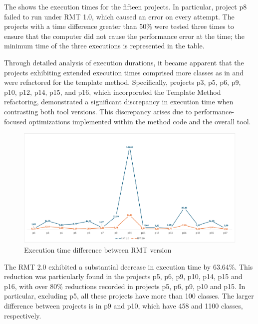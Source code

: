 The  shows the execution times for the fifteen projects. In particular, project p8 failed to run under RMT 1.0, which caused an error on every attempt. The projects with a time difference greater than 50\% were tested three times to ensure that the computer did not cause the performance error at the time; the minimum time of the three executions is represented in the table. 



Through detailed analysis of execution durations, it became apparent that the projects exhibiting extended execution times comprised more classes as in  and were refactored for the template method. Specifically, projects p3, p5, p6, p9, p10, p12, p14, p15, and p16, which incorporated the Template Method refactoring, demonstrated a significant discrepancy in execution time when contrasting both tool versions. This discrepancy arises due to performance-focused optimizations implemented within the method code and the overall tool.

\begin{figure}[ht!]
\caption{Execution time difference between RMT version}
\label{fig-time-chart}
\includegraphics[width =\textwidth]{Chapter-5/Figures/time-diff.png}
\end{figure}
\FloatBarrier

The RMT 2.0 exhibited a substantial decrease in execution time by 63.64\%. This reduction was particularly found in the projects p5, p6, p9, p10, p14, p15 and p16, with over 80\% reductions recorded in projects p5, p6, p9, p10 and p15. In particular, excluding p5, all these projects have more than 100 classes. The larger difference between projects is in p9 and p10, which have 458 and 1100 classes, respectively. 


